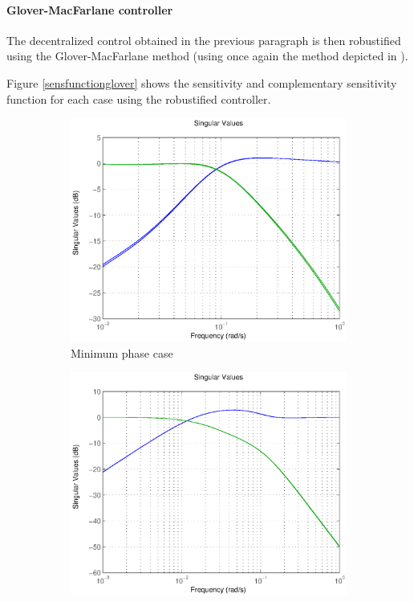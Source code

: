 \paragraph{Glover-MacFarlane controller}

The decentralized control obtained in the previous paragraph is then robustified using the Glover-MacFarlane method (using once again the method depicted in \cite{exo4}). 

Figure \ref{sensfunctionglover} shows the sensitivity and complementary sensitivity function for each case using the robustified controller.

\begin{figure}[h!t]
        \centering
        \begin{subfigure}[b]{0.45\columnwidth}
                \includegraphics[width=\columnwidth]{fig/sensitivity_glover_minphase.eps}
                \caption{Minimum phase case}
        \end{subfigure}
        \begin{subfigure}[b]{0.45\columnwidth}
                \includegraphics[width=\columnwidth]{fig/sensitivity_glover_nonminphase.eps}

\end{subfigure}
\end{figure}
